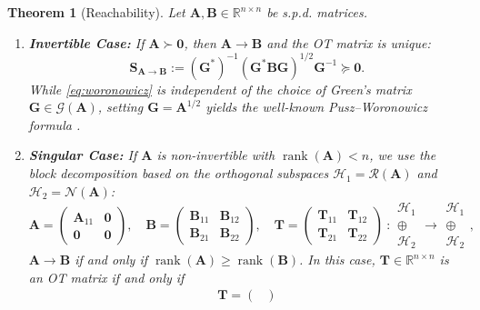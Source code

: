 \documentclass[noinfoline]{imsart}\setcounter{tocdepth}{2}
\renewcommand{\b}[1]{\mathbb{#1}} %
\newcommand{\m}[1]{\mathbf{#1}} %
\renewcommand{\c}[1]{\mathcal{#1}} %
\DeclareMathOperator*{\rk}{rank}
\theoremstyle{plain}
\newtheorem{theorem}{Theorem}[section]
\begin{document}
\begin{theorem}[Reachability]\label{thm:sol:sym}
Let $\m{A}, \m{B} \in \b{R}^{n \times n}$ be s.p.d. matrices. 
\begin{enumerate}[leftmargin = *]
\item \textbf{Invertible Case:} If $\m{A} \succ \m{0}$, then $\m{A} \to \m{B}$ and the OT matrix is unique:
\begin{equation}\label{eq:woronowicz}
    \m{S}_{\m{A} \to \m{B}} := (\m{G}^{*})^{-1} (\m{G}^{*} \m{B} \m{G})^{1/2} \m{G}^{-1} \succeq \m{0}.
\end{equation}
While \eqref{eq:woronowicz} is independent of the choice of Green's matrix $\m{G} \in \c{G}(\m{A})$, setting $\m{G} = \m{A}^{1/2}$ yields the well-known Pusz–Woronowicz formula \cite{pusz1975functional}.
\item \textbf{Singular Case:} If $\m{A}$ is non-invertible with $\rk (\m{A}) < n$, we use the block decomposition based on the orthogonal subspaces $\c{H}_{1} = \c{R}(\m{A})$ and $\c{H}_{2} = \c{N}(\m{A})$:
\begin{equation*}
    \m{A} = \begin{pmatrix}
    \m{A}_{11} & \m{0} \\
    \m{0} & \m{0}
    \end{pmatrix}, \quad
    \m{B} = \begin{pmatrix}
    \m{B}_{11} & \m{B}_{12} \\
    \m{B}_{21} & \m{B}_{22}
    \end{pmatrix}, \quad
    \m{T} = \begin{pmatrix}
    \m{T}_{11} & \m{T}_{12} \\
    \m{T}_{21} & \m{T}_{22}
    \end{pmatrix}
    \    :
    \begin{array}{c}
    \c{H}_{1} \\
    \oplus \\
    \c{H}_{2}
    \end{array}
    \rightarrow
    \begin{array}{c}
    \c{H}_{1} \\
    \oplus \\
    \c{H}_{2}
    \end{array},
\end{equation*}
$\m{A} \to \m{B}$ if and only if $\rk(\m{A}) \geq \rk(\m{B})$. In this case, $\m{T} \in \b{R}^{n \times n}$ is an OT matrix if and only if
\begin{align*}%
    \m{T} =
    \begin{pmatrix}

\end{pmatrix}
\end{align*}
\end{enumerate}
\end{theorem}
\end{document}
